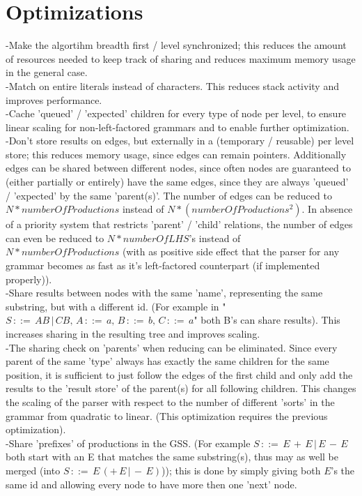 \documentclass[a4paper,10pt]{article}
\begin{document}
\section{Optimizations}

-Make the algortihm breadth first / level synchronized; this reduces the amount of resources needed to keep track of sharing and reduces maximum memory usage in the general case.\\
-Match on entire literals instead of characters. This reduces stack activity and improves performance.\\
-Cache 'queued' / 'expected' children for every type of node per level, to ensure linear scaling for non-left-factored grammars and to enable further optimization.\\
-Don't store results on edges, but externally in a (temporary / reusable) per level store; this reduces memory usage, since edges can remain pointers. Additionally edges can be shared between different nodes, since often nodes are guaranteed to (either partially or entirely) have the same edges, since they are always 'queued' / 'expected' by the same 'parent(s)'. The number of edges can be reduced to $N * numberOfProductions$ instead of $N * (numberOfProductions^{2})$. In absence of a priority system that restricts 'parent' / 'child' relations, the number of edges can even be reduced to $N * numberOfLHS$'s instead of $N * numberOfProductions$ (with as positive side effect that the parser for any grammar becomes as fast as it's left-factored counterpart (if implemented properly)).\\
-Share results between nodes with the same 'name', representing the same substring, but with a different id. (For example in "$S\,::=\,AB\,|\,CB,\,A\,::=\,a,\,B\,::=\,b,\,C\,::=\,a$" both B's can share results). This increases sharing in the resulting tree and improves scaling.\\
-The sharing check on 'parents' when reducing can be eliminated. Since every parent of the same 'type' always has exactly the same children for the same position, it is sufficient to just follow the edges of the first child and only add the results to the 'result store' of the parent(s) for all following children. This changes the scaling of the parser with respect to the number of different 'sorts' in the grammar from quadratic to linear. (This optimization requires the previous optimization).\\
-Share 'prefixes' of productions in the GSS. (For example $S\,::=\,E\,+\,E\,|\,E\,-\,E$ both start with an E that matches the same substring(s), thus may as well be merged (into $S\,::=\,E\,(+\,E\,|\,-\,E)$)); this is done by simply giving both $E$'s the same id and allowing every node to have more then one 'next' node.
\end{document}
